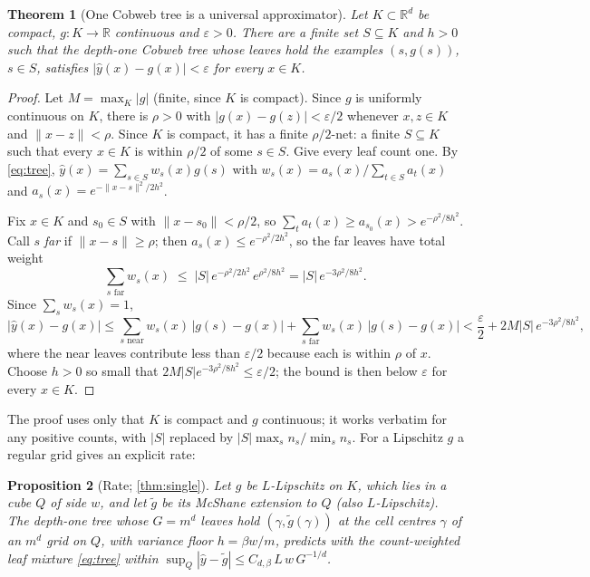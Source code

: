 \documentclass[11pt]{article}
\newtheorem{theorem}{Theorem}
\newtheorem{proposition}[theorem]{Proposition}
\theoremstyle{definition}
\theoremstyle{remark}
\newcommand{\R}{\mathbb{R}}
\newcommand{\hy}{\hat{y}}
\begin{document}
\begin{theorem}[One Cobweb tree is a universal approximator]\label{thm:univ-tree}
Let $K\subset\R^d$ be compact, $g:K\to\R$ continuous and $\varepsilon>0$.  There are a
finite set $S\subseteq K$ and $h>0$ such that the depth-one Cobweb tree whose leaves hold
the examples $(s,g(s))$, $s\in S$, satisfies $|\hy(x)-g(x)|<\varepsilon$ for every $x\in K$.
\end{theorem}

\begin{proof}
Let $M=\max_K|g|$ (finite, since $K$ is compact).  Since $g$ is uniformly continuous on
$K$, there is $\rho>0$ with $|g(x)-g(z)|<\varepsilon/2$ whenever $x,z\in K$ and
$\|x-z\|<\rho$.  Since $K$ is compact, it has a finite $\rho/2$-net: a finite $S\subseteq K$
such that every $x\in K$ is within $\rho/2$ of some $s\in S$.  Give every leaf count one.
By \eqref{eq:tree}, $\hy(x)=\sum_{s\in S}w_s(x)g(s)$ with
$w_s(x)=a_s(x)/\sum_{t\in S}a_t(x)$ and $a_s(x)=e^{-\|x-s\|^2/2h^2}$.

Fix $x\in K$ and $s_0\in S$ with $\|x-s_0\|<\rho/2$, so $\sum_ta_t(x)\ge a_{s_0}(x)>
e^{-\rho^2/8h^2}$.  Call $s$ \emph{far} if $\|x-s\|\ge\rho$; then $a_s(x)\le e^{-\rho^2/2h^2}$,
so the far leaves have total weight
\[
  \sum_{s\text{ far}}w_s(x)\;\le\;|S|\,e^{-\rho^2/2h^2}\,e^{\rho^2/8h^2}=|S|\,e^{-3\rho^2/8h^2}.
\]
Since $\sum_sw_s(x)=1$,
\[
  |\hy(x)-g(x)|\le\sum_{s\text{ near}}w_s(x)\,|g(s)-g(x)|+\sum_{s\text{ far}}w_s(x)\,|g(s)-g(x)|
  <\frac\varepsilon2+2M|S|\,e^{-3\rho^2/8h^2},
\]
where the near leaves contribute less than $\varepsilon/2$ because each is within $\rho$ of
$x$.  Choose $h>0$ so small that $2M|S|e^{-3\rho^2/8h^2}\le\varepsilon/2$; the bound is then
below $\varepsilon$ for every $x\in K$.
\end{proof}

The proof uses only that $K$ is compact and $g$ continuous; it works verbatim for any
positive counts, with $|S|$ replaced by $|S|\max_sn_s/\min_sn_s$.  For a Lipschitz $g$ a
regular grid gives an explicit rate:

\begin{proposition}[Rate; \cref{thm:single}]\label{prop:rate}
Let $g$ be $L$-Lipschitz on $K$, which lies in a cube $Q$ of side $w$, and let $\tilde g$ be
its McShane extension to $Q$ (also $L$-Lipschitz).  The depth-one tree whose $G=m^d$ leaves
hold $(\gamma,\tilde g(\gamma))$ at the cell centres $\gamma$ of an $m^d$ grid on $Q$, with
variance floor $h=\beta w/m$, predicts with the count-weighted leaf mixture
\eqref{eq:tree} within $\sup_Q|\hy-\tilde g|\le C_{d,\beta}\,L\,w\,G^{-1/d}$.
\end{proposition}
\end{document}
